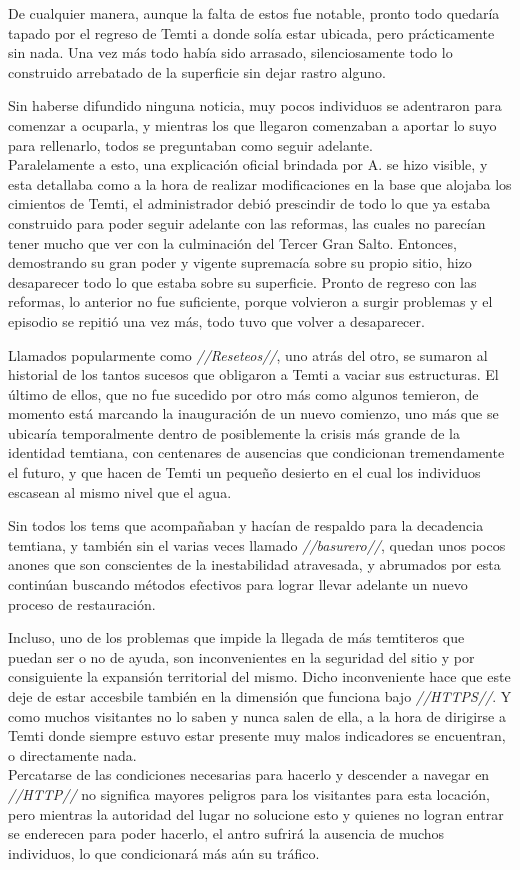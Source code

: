 \documentclass[
  spanish,
]{book}
\begin{document}
De cualquier manera, aunque la falta de estos fue notable, pronto todo quedaría tapado por el regreso de Temti a donde solía estar ubicada, pero prácticamente sin nada. Una vez más todo había sido arrasado, silenciosamente todo lo construido arrebatado de la superficie sin dejar rastro alguno.

Sin haberse difundido ninguna noticia, muy pocos individuos se adentraron para comenzar a ocuparla, y mientras los que llegaron comenzaban a aportar lo suyo para rellenarlo, todos se preguntaban como seguir adelante.\\
Paralelamente a esto, una explicación oficial brindada por A. se hizo visible, y esta detallaba como a la hora de realizar modificaciones en la base que alojaba los cimientos de Temti, el administrador debió prescindir de todo lo que ya estaba construido para poder seguir adelante con las reformas, las cuales no parecían tener mucho que ver con la culminación del Tercer Gran Salto. Entonces, demostrando su gran poder y vigente supremacía sobre su propio sitio, hizo desaparecer todo lo que estaba sobre su superficie. Pronto de regreso con las reformas, lo anterior no fue suficiente, porque volvieron a surgir problemas y el episodio se repitió una vez más, todo tuvo que volver a desaparecer.

Llamados popularmente como \emph{//Reseteos//}, uno atrás del otro, se sumaron al historial de los tantos sucesos que obligaron a Temti a vaciar sus estructuras. El último de ellos, que no fue sucedido por otro más como algunos temieron, de momento está marcando la inauguración de un nuevo comienzo, uno más que se ubicaría temporalmente dentro de posiblemente la crisis más grande de la identidad temtiana, con centenares de ausencias que condicionan tremendamente el futuro, y que hacen de Temti un pequeño desierto en el cual los individuos escasean al mismo nivel que el agua.

Sin todos los tems que acompañaban y hacían de respaldo para la decadencia temtiana, y también sin el varias veces llamado \emph{//basurero//}, quedan unos pocos anones que son conscientes de la inestabilidad atravesada, y abrumados por esta continúan buscando métodos efectivos para lograr llevar adelante un nuevo proceso de restauración.

Incluso, uno de los problemas que impide la llegada de más temtiteros que puedan ser o no de ayuda, son inconvenientes en la seguridad del sitio y por consiguiente la expansión territorial del mismo. Dicho inconveniente hace que este deje de estar accesbile también en la dimensión que funciona bajo \emph{//HTTPS//}. Y como muchos visitantes no lo saben y nunca salen de ella, a la hora de dirigirse a Temti donde siempre estuvo estar presente muy malos indicadores se encuentran, o directamente nada.\\
Percatarse de las condiciones necesarias para hacerlo y descender a navegar en \emph{//HTTP//} no significa mayores peligros para los visitantes para esta locación, pero mientras la autoridad del lugar no solucione esto y quienes no logran entrar se enderecen para poder hacerlo, el antro sufrirá la ausencia de muchos individuos, lo que condicionará más aún su tráfico.
\end{document}
